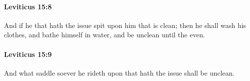		\paragraph{Leviticus 15:8} %
			\label{LEVITICUS-15-8}

			And if he that hath the issue spit upon him that is clean; then he shall wash his clothes, and bathe himself in water, and be unclean until the even.


		\paragraph{Leviticus 15:9} %
			\label{LEVITICUS-15-9}

			And what saddle soever he rideth upon that hath the issue shall be unclean.


